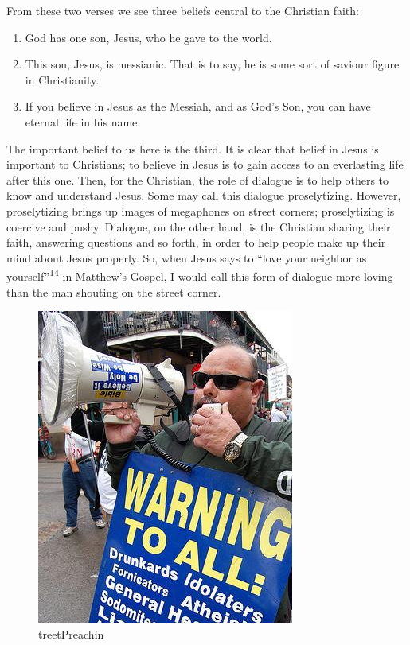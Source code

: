 \documentclass[]{article}
\providecommand{\tightlist}{%
  \setlength{\itemsep}{0pt}\setlength{\parskip}{0pt}}
\begin{document}
From these two verses we see three beliefs central to the Christian
faith:

\begin{enumerate}
\def\labelenumi{\arabic{enumi}.}
\tightlist
\item
  God has one son, Jesus, who he gave to the world.
\item
  This son, Jesus, is messianic. That is to say, he is some sort of
  saviour figure in Christianity.
\item
  If you believe in Jesus as the Messiah, and as God's Son, you can have
  eternal life in his name.
\end{enumerate}

The important belief to us here is the third. It is clear that belief in
Jesus is important to Christians; to believe in Jesus is to gain access
to an everlasting life after this one. Then, for the Christian, the role
of dialogue is to help others to know and understand Jesus. Some may
call this dialogue proselytizing. However, proselytizing brings up
images of megaphones on street corners; proselytizing is coercive and
pushy. Dialogue, on the other hand, is the Christian sharing their
faith, answering questions and so forth, in order to help people make up
their mind about Jesus properly. So, when Jesus says to ``love your
neighbor as yourself''\textsuperscript{14} in Matthew's Gospel, I would
call this form of dialogue more loving than the man shouting on the
street corner.

\begin{figure}
\centering
\includegraphics{./StreetPreaching.jpg}
\caption{treetPreachin}
\end{figure}
\end{document}
